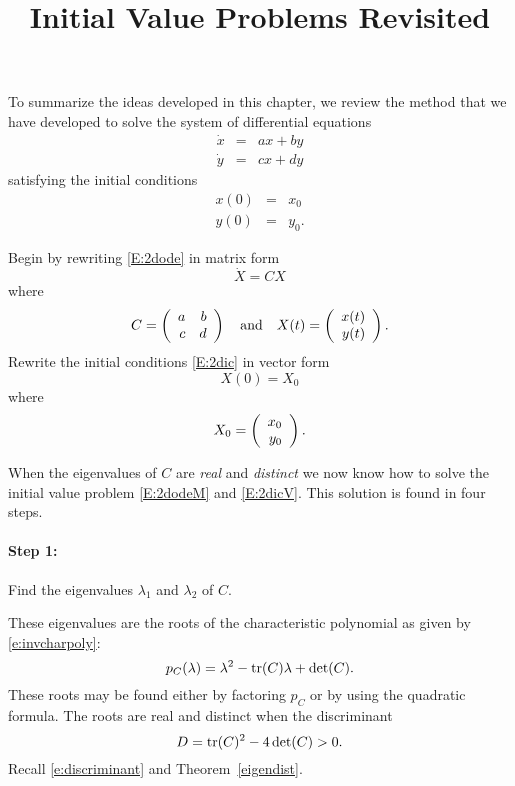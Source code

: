 \documentclass{ximera}
\title{Initial Value Problems Revisited}
\begin{document}
\begin{abstract}
\end{abstract}
\maketitle


\label{S:IVPR}

To summarize the ideas developed in this chapter, we review the method
that we have developed to solve the system of differential equations
\begin{equation} \label{E:2dode}
\begin{array}{rcl}
\dot{x} & = & ax+by \\
\dot{y} & = & cx+dy
\end{array}
\end{equation}
satisfying the initial conditions
\begin{equation} \label{E:2dic}
\begin{array}{rcl}
   x(0) & = & x_0 \\
   y(0) & = & y_0.
\end{array}
\end{equation}

Begin by rewriting \eqref{E:2dode} in matrix form
\begin{equation}  \label{E:2dodeM}
\dot{X} = CX
\end{equation}
where
\[
C = \left(\begin{array}{rr} a & b\\ c &d\end{array}\right) \quad\mbox{and}\quad X(t)=\left(\begin{array}{r} x(t) \\ y(t)\end{array}\right).
\]
Rewrite the initial conditions \eqref{E:2dic} in vector form
\begin{equation}  \label{E:2dicV}
X(0) = X_0
\end{equation}
where
\[
X_0=\left(\begin{array}{r} x_0 \\ y_0\end{array}\right).
\]

When the eigenvalues of $C$ are {\em real\/} and {\em distinct\/} we now
know how to solve the initial value problem \eqref{E:2dodeM} and \eqref{E:2dicV}.
This solution is found in four steps.

\paragraph{Step 1:}  Find the eigenvalues $\lambda_1$ and $\lambda_2$ of $C$.

These eigenvalues are the roots of the characteristic
polynomial as given by \eqref{e:invcharpoly}:
\[
p_C(\lambda)=\lambda^2-{\rm tr}(C)\lambda+\det(C).
\]
These roots may be found either by factoring $p_C$ or by using the quadratic
formula.  The roots are real and distinct when the discriminant
\[
D={\rm tr}(C)^2-4\det(C)>0.
\]
Recall \eqref{e:discriminant} and Theorem~\ref{eigendist}.
\end{document}
